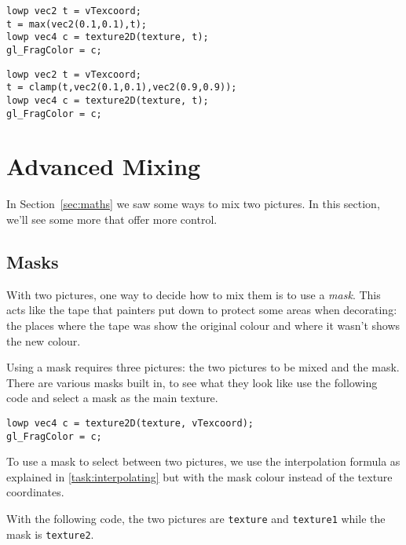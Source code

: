 \documentclass[
  html5,%
  mathml,%
  use filename%
]{internet}
\makeatletter
\let\prev@sec=\section
\renewcommand\section{\clearpage\prev@sec}
\makeatother
\begin{document}
\begin{tcolorbox}
\begin{verbatim}
lowp vec2 t = vTexcoord;
t = max(vec2(0.1,0.1),t);
lowp vec4 c = texture2D(texture, t);
gl_FragColor = c;
\end{verbatim}
\end{tcolorbox}

\begin{tcolorbox}
\begin{verbatim}
lowp vec2 t = vTexcoord;
t = clamp(t,vec2(0.1,0.1),vec2(0.9,0.9));
lowp vec4 c = texture2D(texture, t);
gl_FragColor = c;
\end{verbatim}
\end{tcolorbox}

\section{Advanced Mixing}

In Section~\ref{sec:maths} we saw some ways to mix two pictures.
In this section, we'll see some more that offer more control.

\subsection{Masks}

With two pictures, one way to decide how to mix them is to use a \emph{mask}.
This acts like the tape that painters put down to protect some areas when decorating: the places where the tape was show the original colour and where it wasn't shows the new colour.

Using a mask requires three pictures: the two pictures to be mixed and the mask.
There are various masks built in, to see what they look like use the following code and select a mask as the main texture.

\begin{tcolorbox}
\begin{verbatim}
lowp vec4 c = texture2D(texture, vTexcoord);
gl_FragColor = c;
\end{verbatim}
\end{tcolorbox}

To use a mask to select between two pictures, we use the interpolation formula as explained in \ref{task:interpolating} but with the mask colour instead of the texture coordinates.

With the following code, the two pictures are \verb+texture+ and \verb+texture1+ while the mask is \verb+texture2+.
\end{document}
